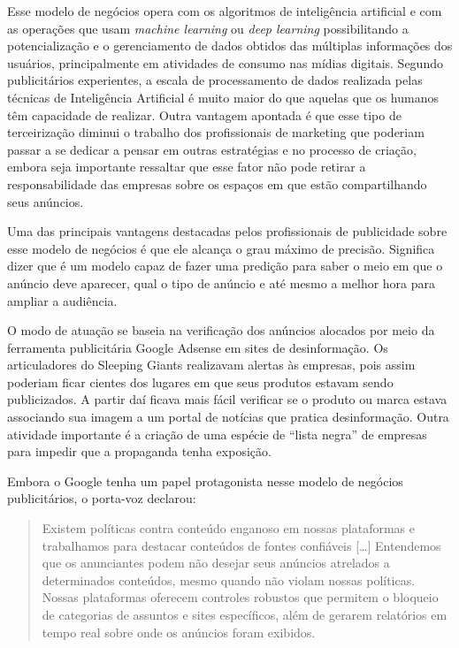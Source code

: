 Esse modelo de negócios opera com os algoritmos de inteligência
artificial e com as operações que usam \textit{machine learning} ou
\textit{deep learning} possibilitando a potencialização e o gerenciamento
de dados obtidos das múltiplas informações dos usuários, principalmente
em atividades de consumo nas mídias digitais. Segundo publicitários
experientes, a escala de processamento de dados realizada pelas técnicas
de Inteligência Artificial é muito maior do que aquelas que os humanos têm
capacidade de realizar. Outra vantagem apontada é que esse tipo de
terceirização diminui o trabalho dos profissionais de marketing que
poderiam passar a se dedicar a pensar em outras estratégias e no
processo de criação, embora seja importante ressaltar que esse fator não
pode retirar a responsabilidade das empresas sobre os espaços em que
estão compartilhando seus anúncios.

Uma das principais vantagens destacadas pelos profissionais de
publicidade sobre esse modelo de negócios é que ele alcança o grau
máximo de precisão. Significa dizer que é um modelo capaz de fazer uma
predição para saber o meio em que o anúncio deve aparecer, qual o tipo
de anúncio e até mesmo a melhor hora para ampliar a audiência.

O modo de atuação se baseia na verificação dos anúncios alocados por
meio da ferramenta publicitária Google Adsense em sites de
desinformação. Os articuladores do Sleeping Giants realizavam alertas às
empresas, pois assim poderiam ficar cientes dos lugares em que seus
produtos estavam sendo publicizados. A partir daí ficava mais fácil
verificar se o produto ou marca estava associando sua imagem a um portal de
notícias que pratica desinformação. Outra atividade importante é a
criação de uma espécie de ``lista negra'' de empresas para impedir que a
propaganda tenha exposição.

Embora o Google tenha um papel protagonista nesse modelo de negócios
publicitários, o porta-voz declarou:

\begin{quote}
Existem políticas contra conteúdo enganoso em nossas plataformas e trabalhamos
para destacar conteúdos de fontes confiáveis {[}\ldots{]} Entendemos que os
anunciantes podem não desejar seus anúncios atrelados a determinados
conteúdos, mesmo quando não violam nossas políticas. Nossas plataformas
oferecem controles robustos que permitem o bloqueio de categorias de
assuntos e sites específicos, além de gerarem relatórios em tempo real
sobre onde os anúncios foram exibidos. 
\end{quote}

